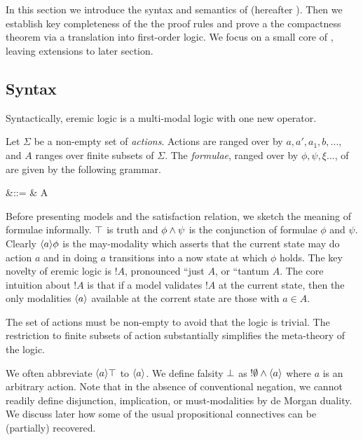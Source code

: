\section{\ELFULL}\label{coreEL}

In this section we introduce the syntax and semantics of \ELFULL{}
(hereafter \ELABR{}).  Then we establish key completeness of the the
proof rules and prove a the compactness theorem via a translation into
first-order logic. We focus on a small core of \ELABR{}, leaving
extensions to later section.

\subsection{Syntax}

\NI Syntactically, eremic logic is a multi-modal logic with one new
operator.

\begin{definition} Let $\Sigma$ be a non-empty set of \emph{actions}.
Actions are ranged over by $a, a', a_1, b, ...$, and $A$ ranges over
finite subsets of $\Sigma$. The \emph{formulae}, ranged over by $\phi,
\psi, \xi ...$, of \ELABR{} are given by the
following grammar.

\begin{GRAMMAR}
  \phi 
     &\quad ::= \quad & 
  \TRUE 
     \VERTICAL 
  \phi \AND \psi
     \VERTICAL 
     \VERTICAL 
  \fBang A 
\end{GRAMMAR}
\end{definition}

\NI  Before presenting models and the satisfaction relation, we sketch
the meaning of formulae informally. $\top$ is truth and $\phi \land
\psi$ is the conjunction of formulae $\phi$ and $\psi$. Clearly
$\langle a \rangle \phi$ is the may-modality which asserts that the current
state may do action $a$ and in doing $a$ transitions into a now state
at which $\phi$ holds.  The key novelty of eremic logic is $!A$,
pronounced ``just $A$, or ``tantum $A$. The core intuition about $!A$
is that if a model validates $!A$ at the current state, then the only
modalities $\langle a \rangle$ available at the corrent state are those with
$a \in A$. 

The set of actions must be non-empty to avoid that the logic is
trivial. The restriction to finite subsets of action substantially
simplifies the meta-theory of the logic.

We often abbreviate $\langle a \rangle \top$ to $\langle a \rangle$. We define falsity
$\bot$ as $!\emptyset \land \langle a \rangle$ where $a$ is an arbitrary
action. Note that in the absence of conventional negation, we cannot
readily define disjunction, implication, or must-modalities by de
Morgan duality. We discuss later  how some of the usual
propositional connectives can be (partially) recovered. 

